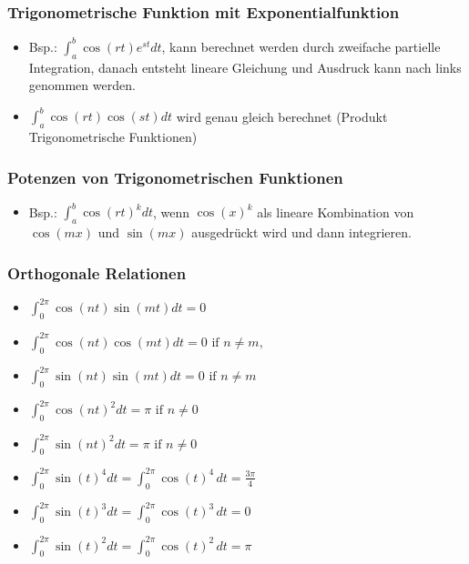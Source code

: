 \documentclass[a3paper, 11pt, landscape]{scrartcl}
\begin{document}
\begin{multicols*}{3}
	\subsubsection{Trigonometrische Funktion mit Exponentialfunktion}
	\begin{itemize}
	    \item Bsp.: $\int_{a}^{b} \cos (r t) e^{s t} d t$, kann berechnet werden durch zweifache partielle Integration, danach entsteht lineare Gleichung und Ausdruck kann nach links genommen werden.
	    \item $\int_{a}^{b} \cos (r t) \cos (s t) d t$ wird genau gleich berechnet (Produkt Trigonometrische Funktionen)
	\end{itemize}
	\subsubsection{Potenzen von Trigonometrischen Funktionen}
	\begin{itemize}
	    \item Bsp.: $\int_{a}^{b} \cos (r t)^{k} d t$, wenn $\cos(x)^k$ als lineare Kombination von $\cos(mx)$ und $\sin(mx)$ ausgedrückt wird und dann integrieren.
	\end{itemize}
	\subsubsection{Orthogonale Relationen}
	\begin{itemize}
	    \item $\int_{0}^{2 \pi} \cos (n t) \sin (m t) d t=0$
	    \item $\int_{0}^{2 \pi} \cos (n t) \cos (m t) d t=0 \text { if } n \neq m,$
	    \item$\int_{0}^{2 \pi} \sin (n t) \sin (m t) d t=0 \text { if } n \neq m$ 
	    \item$\int_{0}^{2 \pi} \cos (n t)^{2} d t=\pi \text { if } n \neq 0$ 
	    \item$\int_{0}^{2 \pi} \sin (n t)^{2} d t=\pi \text { if } n \neq 0$
	    \item$\int_{0}^{2 \pi} \sin (t)^{4} d t= \int_{0}^{2 \pi} \cos (t)^{4} \,d t=\frac{3\pi}{4}$
	    \item$\int_{0}^{2 \pi} \sin (t)^{3} d t= \int_{0}^{2 \pi} \cos (t)^{3} \,d t=0$
	    \item$\int_{0}^{2 \pi} \sin (t)^{2} d t= \int_{0}^{2 \pi} \cos (t)^{2} \,d t=\pi$
	    
	\end{itemize}
	

\end{multicols*}
\end{document}
